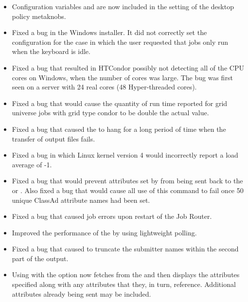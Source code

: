 \begin{itemize}

\item Configuration variables
 and  are now 
included in the setting of the desktop policy metaknobs.

\item Fixed a bug in the Windows installer.
It did not correctly set the configuration
for the case in which the user requested that 
jobs only run when the keyboard is idle.

\item Fixed a bug that resulted in HTCondor possibly not detecting all of 
the CPU cores on Windows, when the number of cores was large. 
The bug was first seen on a server with 24 real cores (48 Hyper-threaded cores).

\item Fixed a bug that would cause the quantity of run time reported for 
grid universe jobs with grid type condor to be double the actual value.

\item Fixed a bug that caused the  to hang for a long
period of time when the transfer of output files fails.

\item Fixed a bug in which Linux kernel version 4 would incorrectly report
a load average of -1.

\item Fixed a bug that would prevent attributes set by  
from being sent back to the  or . Also fixed a bug that would
cause all use of this  command to fail once 50 unique ClassAd attribute names had been set.

\item Fixed a bug that caused job errors upon restart of the Job Router.

\item Improved the performance of the  by using lightweight
polling.

\item Fixed a bug that caused  
 to truncate the submitter names within the second part of
the output.

\item Using   with the  option
now fetches from the  
and then displays the attributes specified along with any attributes that
they, in turn, reference.
Additional attributes already being sent may be included.


\end{itemize}
